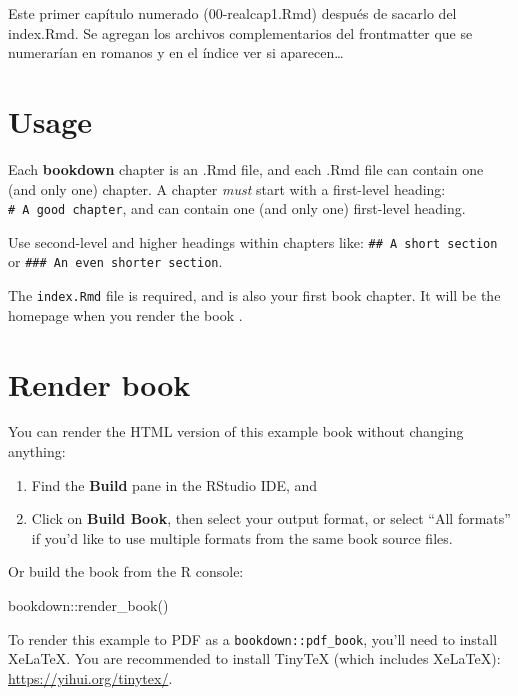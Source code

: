 \documentclass[
  11pt,
  twoside]{book}
\newenvironment{Shaded}{\begin{snugshade}}{\end{snugshade}}
\newcommand{\FunctionTok}[1]{\textcolor[rgb]{0.00,0.00,0.00}{#1}}
\newcommand{\NormalTok}[1]{#1}
\newcommand{\SpecialCharTok}[1]{\textcolor[rgb]{0.00,0.00,0.00}{#1}}
\theoremstyle{definition}
\theoremstyle{definition}
\theoremstyle{definition}
\theoremstyle{definition}
\theoremstyle{remark}
\begin{document}
Este primer capítulo numerado (00-realcap1.Rmd) después de sacarlo del index.Rmd. Se agregan los archivos complementarios del frontmatter que se numerarían en romanos y en el índice ver si aparecen\ldots{}

\hypertarget{usage}{%
\section{Usage}\label{usage}}

Each \textbf{bookdown} chapter is an .Rmd file, and each .Rmd file can contain one (and only one) chapter. A chapter \emph{must} start with a first-level heading: \texttt{\#\ A\ good\ chapter}, and can contain one (and only one) first-level heading.

Use second-level and higher headings within chapters like: \texttt{\#\#\ A\ short\ section} or \texttt{\#\#\#\ An\ even\ shorter\ section}.

The \texttt{index.Rmd} file is required, and is also your first book chapter. It will be the homepage when you render the book .

\hypertarget{render-book}{%
\section{Render book}\label{render-book}}

You can render the HTML version of this example book without changing anything:

\begin{enumerate}
\def\labelenumi{\arabic{enumi}.}
\item
  Find the \textbf{Build} pane in the RStudio IDE, and
\item
  Click on \textbf{Build Book}, then select your output format, or select ``All formats'' if you'd like to use multiple formats from the same book source files.
\end{enumerate}

Or build the book from the R console:

\begin{Shaded}
\begin{Highlighting}[]
\NormalTok{bookdown}\SpecialCharTok{::}\FunctionTok{render\_book}\NormalTok{()}
\end{Highlighting}
\end{Shaded}

To render this example to PDF  as a \texttt{bookdown::pdf\_book}, you'll need to install XeLaTeX. You are recommended to install TinyTeX (which includes XeLaTeX): \url{https://yihui.org/tinytex/}.
\end{document}
